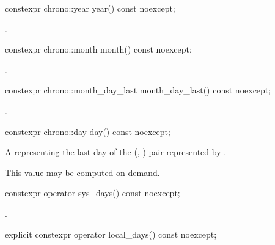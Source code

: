 %
\begin{itemdecl}
constexpr chrono::year year() const noexcept;
\end{itemdecl}

\begin{itemdescr}
\pnum
\returns {}.
\end{itemdescr}

%
\begin{itemdecl}
constexpr chrono::month month() const noexcept;
\end{itemdecl}

\begin{itemdescr}
\pnum
\returns {}.
\end{itemdescr}

%
\begin{itemdecl}
constexpr chrono::month_day_last month_day_last() const noexcept;
\end{itemdecl}

\begin{itemdescr}
\pnum
\returns {}.
\end{itemdescr}

%
\begin{itemdecl}
constexpr chrono::day day() const noexcept;
\end{itemdecl}

\begin{itemdescr}
\pnum
\returns
A  representing the last day of the (, ) pair
represented by .

\pnum
\begin{note}
This value may be computed on demand.
\end{note}
\end{itemdescr}

%
\begin{itemdecl}
constexpr operator sys_days() const noexcept;
\end{itemdecl}

\begin{itemdescr}
\pnum
\returns {}.
\end{itemdescr}

%
\begin{itemdecl}
explicit constexpr operator local_days() const noexcept;
\end{itemdecl}

